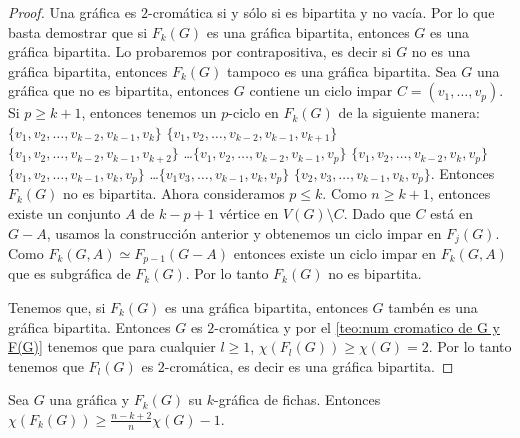 \begin{proof}
    Una gr\'afica es $2$-crom\'atica si y s\'olo si es bipartita y no
    vac\'ia. Por lo que basta demostrar que si $F_k(G)$ es una gr\'afica
    bipartita, entonces $G$ es una gr\'afica bipartita. Lo probaremos por
    contrapositiva, es decir si $G$ no es una gr\'afica bipartita, entonces
    $F_k(G)$ tampoco es una gr\'afica bipartita. Sea $G$ una gr\'afica que
    no es bipartita, entonces $G$ contiene un ciclo impar $C=(v_1, \dots,
    v_p)$. Si $p \geq k+1$, entonces tenemos un $p$-ciclo en $F_k(G)$ de la
    siguiente manera: $\{v_1, v_2, \dots, v_{k-2}, v_{k-1}, v_k\}$ $\{v_1,
    v_2, \dots, v_{k-2}, v_{k-1}, v_{k+1}\}$ $\{v_1, v_2, \dots, v_{k-2},
    v_{k-1}, v_{k+2}\}$ \dots $\{v_1, v_2, \dots, v_{k-2}, v_{k-1}, v_p\}$
    $\{v_1, v_2, \dots, v_{k-2}, v_k, v_p\}$ $\{v_1, v_2, \dots, v_{k-1},
    v_k, v_p\}$ \dots $\{v_1 v_3, \dots, v_{k-1}, v_k, v_p\}$ $\{v_2, v_3,
    \dots, v_{k-1}, v_k, v_p\}$. Entonces $F_k(G)$ no es bipartita. Ahora
    consideramos $p \leq k$. Como $n \geq k+1$, entonces existe un conjunto
    $A$ de $k-p+1$ v\'ertice en $V(G)\setminus C$. Dado que $C$ est\'a en $G
    -A$, usamos la construcci\'on anterior y obtenemos un ciclo impar en
    $F_j(G)$. Como $F_k(G,A) \simeq F_{p-1}(G-A)$ entonces existe un ciclo
    impar en $F_k(G,A)$ que es subgr\'afica de $F_k(G)$. Por lo tanto
    $F_k(G)$ no es bipartita.

    Tenemos que, si $F_k(G)$ es una gr\'afica bipartita, entonces $G$
    tamb\'en es una gr\'afica bipartita. Entonces $G$ es $2$-crom\'atica y
    por el \cref{teo:num cromatico de G y F(G)} tenemos que para cualquier $l\geq 1$, $\chi
    (F_l(G)) \geq \chi (G)=2$. Por lo tanto tenemos que $F_l(G)$ es
    $2$-crom\'atica, es decir es una gr\'afica bipartita.
\end{proof}

    \begin{teorema}
        \label{relacion num cromatico G y F(G) con k}
            Sea $G$ una gr\'afica y $F_k(G)$ su $k$-gr\'afica de fichas.
            Entonces $\chi(F_k(G)) \geq \frac{n-k+2}{n} \chi(G) -1$.
        \end{teorema}
        
